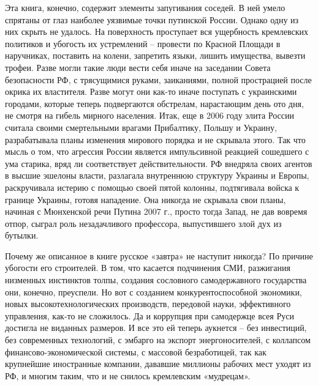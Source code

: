Эта книга, конечно, содержит элементы запугивания соседей. В ней умело спрятаны
от глаз наиболее уязвимые точки путинской России. Однако одну из них скрыть не
удалось. На поверхность проступает вся ущербность кремлевских политиков и
убогость их устремлений – провести по Красной Площади в наручниках, поставить
на колени, запретить языки, лишить имущества, вывезти трофеи. Разве могли такие
люди вести себя иначе на заседании Совета безопасности РФ, с трясущимися
руками, заиканиями, полной прострацией после окрика их властителя. Разве могут
они как-то иначе поступать с украинскими городами, которые теперь подвергаются
обстрелам, нарастающим день ото дня, не смотря на гибель мирного населения.
Итак, еще в 2006 году элита России считала своими смертельными врагами
Прибалтику, Польшу и Украину, разрабатывала планы изменения мирового порядка и
не скрывала этого. Так что мысль о том, что агрессия России является
импульсивной реакцией сошедшего с ума старика, вряд ли соответствует
действительности. РФ внедряла своих агентов в высшие эшелоны власти, разлагала
внутреннюю структуру Украины и Европы, раскручивала истерию с помощью своей
пятой колонны, подтягивала войска к границе Украины, готовя нападение. Она
никогда не скрывала свои планы, начиная с Мюнхенской речи Путина 2007 г.,
просто тогда Запад, не дав вовремя отпор, сыграл роль незадачливого профессора,
выпустившего злой дух из бутылки.

Почему же описанное в книге русское «завтра» не наступит никогда? По причине
убогости его строителей. В том, что касается подчинения СМИ, разжигания
низменных инстинктов толпы, создания сословного самодержавного государства они,
конечно, преуспели. Но вот с созданием конкурентоспособной экономики, новых
высокотехнологических производств, передовой науки, эффективного управления,
как-то не сложилось. Да и коррупция при самодержце всея Руси достигла не
виданных размеров. И все это ей теперь аукнется – без инвестиций, без
современных технологий, с эмбарго на экспорт энергоносителей, с коллапсом
финансово-экономической системы, с массовой безработицей, так как крупнейшие
иностранные компании, дававшие миллионы рабочих мест уходят из РФ, и многим
таким, что и не снилось кремлевским «мудрецам».
